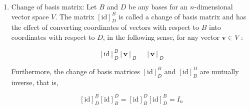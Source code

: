\documentclass{article}
\begin{document}
\begin{enumerate}
        \item Change of basis matrix: Let $B$ and $D$ be any bases for an $n$-dimensional vector space $V$. The matrix $[\mathrm{id}]_{D}^{B}$ is called a change of basis matrix and has the effect of converting coordinates of vectors with respect to $B$ into coordinates with respect to $D$, in the following sense, for any vector $\mathbf{v} \in V$ :

        $$
        [\mathrm{id}]_{D}^{B}[\mathbf{v}]_{B}=[\mathbf{v}]_{D}
        $$

        Furthermore, the change of basis matrices $[\mathrm{id}]_{D}^{B}$ and $[\mathrm{id}]_{B}^{D}$ are mutually inverse, that is,

        $$
        [\mathrm{id}]_{D}^{B}[\mathrm{id}]_{B}^{D}=[\mathrm{id}]_{B}^{D}[\mathrm{id}]_{D}^{B}=I_{n}
        $$
    \end{enumerate}
\end{document}
